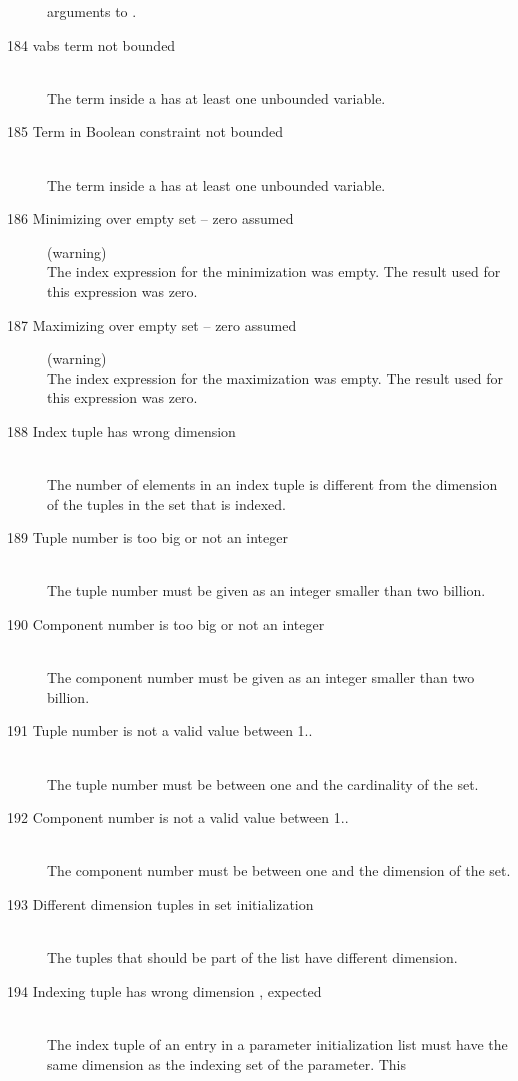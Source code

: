 \begin{description}
   arguments to . 
\item[184 vabs term not bounded]\ \\
   The term inside a  has at least one unbounded variable.
\item[185 Term in Boolean constraint not bounded]\ \\
   The term inside a  has at least one unbounded variable.
%
%
\item[186 Minimizing over empty set -- zero assumed] (warning)\ \\
   The index expression for the minimization was empty. The result
   used for this expression was zero.
\item[187 Maximizing over empty set -- zero assumed] (warning)\ \\
   The index expression for the maximization was empty. The result
   used for this expression was zero.
\item[188 Index tuple has wrong dimension]\ \\
   The number of elements in an index tuple is different from the
   dimension of the tuples in the set that is indexed.
\item[189 Tuple number \code{xxx} is too big or not an integer]\ \\
  The tuple number must be given as an integer smaller than two
  billion.
\item[190 Component number \code{xxx} is too big or not an integer]\ \\
  The component number must be given as an integer smaller than two
  billion.
\item[191 Tuple number \code{xxx} is not a valid value between 1..\code{yyy}]\ \\
  The tuple number must be between one and the cardinality of the set.
\item[192 Component number \code{xxx} is not a valid value between 1..\code{yyy}]\ \\
  The component number must be between one and the dimension of the set.
\item[193 Different dimension tuples in set initialization]\ \\
  The tuples that should be part of the list have different dimension.
\item[194 Indexing tuple \code{xxx} has wrong dimension
           \code{yyy}, expected \code{zzz}]\ \\
  The index tuple of an entry in a parameter initialization list must
  have the same dimension as the indexing set of the parameter. This

\end{description}
